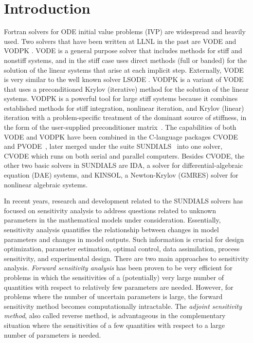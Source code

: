 \section{Introduction}\label{s:introduction}

Fortran solvers for ODE initial value problems (IVP) are widespread and heavily used. 
Two solvers that have been written at LLNL in the past are VODE \cite{BBH:89} 
and VODPK \cite{Byr:92}.
%
VODE is a general purpose solver that includes methods for stiff
and nonstiff systems, and in the stiff case uses direct methods (full or
banded) for the solution of the linear systems that arise at each implicit
step. Externally, VODE is very similar to the well known solver
LSODE \cite{RaHi:94}. 
VODPK is a variant of VODE that uses a preconditioned Krylov 
(iterative) method for the solution of the linear systems. VODPK is a powerful 
tool for large stiff systems because it combines established methods for stiff 
integration, nonlinear iteration, and Krylov (linear) iteration with a problem-specific
treatment of the dominant source of stiffness, in the form of the user-supplied
preconditioner matrix~\cite{BrHi:89}.
%
The capabilities of both VODE and VODPK have been combined in the C-language 
packages CVODE~\cite{CoHi:96} and PVODE~\cite{ByHi:99}, later merged under the
suite SUNDIALS~\cite{HBGLSSW:03} into one solver, CVODE which runs on both
serial and parallel computers. Besides CVODE, the other two basic solvers in SUNDIALS
are IDA, a solver for differential-algebraic equation (DAE) systems, and
KINSOL, a Newton-Krylov (GMRES) solver for nonlinear algebraic systems.

In recent years, research and development related to the SUNDIALS solvers has
focused on sensitivity analysis to address questions related to unknown 
parameters in the mathematical models under consideration.
Essentially, sensitivity analysis quantifies the relationship between
changes in model parameters and changes in model outputs. Such information 
is crucial for design optimization, parameter estimation, optimal control, data
assimilation, process sensitivity, and experimental design.
%
There are two main approaches to sensitivity analysis.
{\em Forward sensitivity analysis} has been proven to be very efficient for
problems in which the sensitivities of a (potentially) very large
number of quantities with respect to relatively few parameters are
needed.  However, for problems where the number of uncertain
parameters is large, the forward sensitivity method becomes
computationally intractable.  The {\em adjoint sensitivity method}, also called
reverse method, is advantageous in the complementary situation where the sensitivities of
a few quantities with respect to a large number of parameters is needed.

